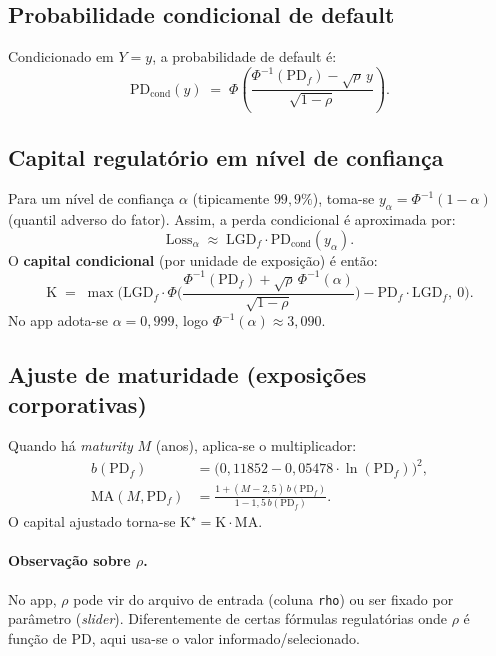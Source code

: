 \documentclass[11pt,a4paper]{article}
\newcommand{\PD}{\mathrm{PD}}
\newcommand{\LGD}{\mathrm{LGD}}
\newcommand{\Kcap}{\mathrm{K}}
\newcommand{\Rho}{\rho}
\begin{document}
\subsection{Probabilidade condicional de default}
Condicionado em \(Y=y\), a probabilidade de default é:
\begin{equation}
\PD_{\text{cond}}(y) \;=\; \Phi\!\left(\frac{\Phi^{-1}(\PD_f) - \sqrt{\Rho}\,y}{\sqrt{1-\Rho}}\right).
\end{equation}

\subsection{Capital regulatório em nível de confiança}
Para um nível de confiança \(\alpha\) (tipicamente \(99{,}9\%\)), toma-se \(y_\alpha = \Phi^{-1}(1-\alpha)\) (quantil adverso do fator). Assim, a perda condicional é aproximada por:
\begin{equation}
\mathrm{Loss}_\alpha \;\approx\; \LGD_f \cdot \PD_{\text{cond}}(y_\alpha).
\end{equation}
O \textbf{capital condicional} (por unidade de exposição) é então:
\begin{equation}
\Kcap \;=\; \max\!\Big(\LGD_f \cdot \Phi\!\Big(\frac{\Phi^{-1}(\PD_f) + \sqrt{\Rho}\,\Phi^{-1}(\alpha)}{\sqrt{1-\Rho}}\Big) - \PD_f \cdot \LGD_f,\ 0\Big).
\label{eq:K}
\end{equation}
No app adota-se \(\alpha = 0{,}999\), logo \(\Phi^{-1}(\alpha)\approx 3{,}090\).

\subsection{Ajuste de maturidade (exposições corporativas)}
Quando há \emph{maturity} \(M\) (anos), aplica-se o multiplicador:
\begin{align}
b(\PD_f) &= \big(0{,}11852 - 0{,}05478\cdot \ln(\PD_f)\big)^2,\\
\mathrm{MA}(M,\PD_f) &= \frac{1 + (M-2{,}5)\,b(\PD_f)}{1 - 1{,}5\, b(\PD_f)}.
\end{align}
O capital ajustado torna-se \(\Kcap^\star = \Kcap \cdot \mathrm{MA}\).

\paragraph{Observação sobre \(\Rho\).} No app, \(\Rho\) pode vir do arquivo de entrada (coluna \texttt{rho}) ou ser fixado por parâmetro (\emph{slider}). Diferentemente de certas fórmulas regulatórias onde \(\Rho\) é função de \(\PD\), aqui usa-se o valor informado/selecionado.
\end{document}
